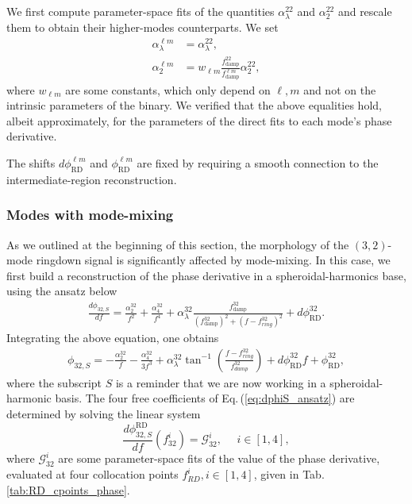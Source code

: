 \documentclass[twocolumn,prd,aps,superscriptaddress,preprintnumbers,tightenlines,showpacs,nofootinbib,eqsecnum,amsfonts,amsmath]{revtex4}
\begin{document}
We first compute parameter-space fits of the quantities $\alpha_{\lambda}^{22}$ and $\alpha_{2}^{22}$ and rescale them to obtain their higher-modes counterparts.
We set 
\begin{align}
\alpha_{\lambda}^{\ell m}&=\alpha_{\lambda}^{22}, \nonumber\\ \alpha_2^{\ell m}&=w_{\ell m}\frac{f_{\mathrm{damp}}^{22}}{f_{\mathrm{damp}}^{\ell m}} \alpha_2^{22},
\end{align}
where $w_{\ell m}$ are some constants, which only depend on $\ell,m$ and not on the intrinsic parameters of the binary. We verified that the above equalities hold, albeit approximately, for the parameters of the direct fits to each mode's phase derivative. 

The shifts $d\phi_{\mathrm{RD}}^{\ell m}$ and $\phi_{\mathrm{RD}}^{\ell m}$ are fixed by requiring a smooth connection to the intermediate-region reconstruction. 

\subsubsection{Modes with mode-mixing}
As we outlined at the beginning of this section, the morphology of the $(3,2)$-mode ringdown signal is significantly affected by mode-mixing. In this case, we first build a reconstruction of the phase derivative in a spheroidal-harmonics base, using the ansatz below
\begin{align}
\label{eq:dphiS_ansatz}
\frac{d\phi_{32,S}}{df}= \frac{\alpha_2^{32}}{f^2} +\frac{\alpha_4^{32}}{f^4} + \alpha_\lambda^{32} \frac{f_{\mathrm{damp}}^{32}}{(f_{\mathrm{damp}}^{32})^2+(f-f^{32}_{ring})^2}+d\phi_{\mathrm{RD}}^{32}.
\end{align}
Integrating the above equation, one obtains
\begin{align}
\phi_{32,S}=-\frac{\alpha_2^{32}} {f}-\frac{\alpha_4^{32}} {3 f^3}+\alpha_\lambda^{32} \tan ^{-1}\left(\frac{f-f_{ring}^{32}}{f_{damp}^{32}}\right)+d\phi_{\mathrm{RD}}^{32} f +\phi_{\mathrm{RD}}^{32},
\end{align}
where the subscript $S$ is a reminder that we are now working in a spheroidal-harmonic basis. The four free coefficients of Eq.\,(\ref{eq:dphiS_ansatz}) are determined by solving the linear system
\begin{equation}
\frac{d\phi_{32,S}^{\mathrm{RD}}}{df}(f_{32}^{i})=\mathcal{G}^{i}_{32},\ \ \ \ \ \ i \in\left[1,4\right],
\end{equation}
where $\mathcal{G}^{i}_{32}$ are some parameter-space fits of the value of the phase derivative, evaluated at four collocation points $f_{RD}^{i}, i\in[1,4]$, given in Tab.\,\ref{tab:RD_cpoints_phase}.
\end{document}
